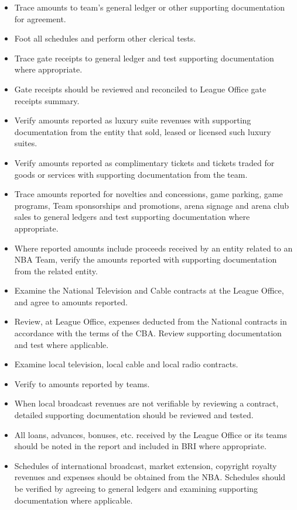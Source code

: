 \documentclass[
]{book}
\providecommand{\tightlist}{%
  \setlength{\itemsep}{0pt}\setlength{\parskip}{0pt}}
\begin{document}
\begin{itemize}
\tightlist
\item
  Trace amounts to team's general ledger or other supporting documentation for agreement.
\item
  Foot all schedules and perform other clerical tests.
\item
  Trace gate receipts to general ledger and test supporting documentation where appropriate.
\item
  Gate receipts should be reviewed and reconciled to League Office gate receipts summary.
\item
  Verify amounts reported as luxury suite revenues with supporting documentation from the entity that sold, leased or licensed such luxury suites.
\item
  Verify amounts reported as complimentary tickets and tickets traded for goods or services with supporting documentation from the team.
\item
  Trace amounts reported for novelties and concessions, game parking, game programs, Team sponsorships and promotions, arena signage and arena club sales to general ledgers and test supporting documentation where appropriate.
\item
  Where reported amounts include proceeds received by an entity related to an NBA Team, verify the amounts reported with supporting documentation from the related entity.
\item
  Examine the National Television and Cable contracts at the League Office, and agree to amounts reported.
\item
  Review, at League Office, expenses deducted from the National contracts in accordance with the terms of the CBA. Review supporting documentation and test where applicable.
\item
  Examine local television, local cable and local radio contracts.
\item
  Verify to amounts reported by teams.
\item
  When local broadcast revenues are not verifiable by reviewing a contract, detailed supporting documentation should be reviewed and tested.
\item
  All loans, advances, bonuses, etc. received by the League Office or its teams should be noted in the report and included in BRI where appropriate.
\item
  Schedules of international broadcast, market extension, copyright royalty revenues and expenses should be obtained from the NBA. Schedules should be verified by agreeing to general ledgers and examining supporting documentation where applicable.

\end{itemize}
\end{document}
